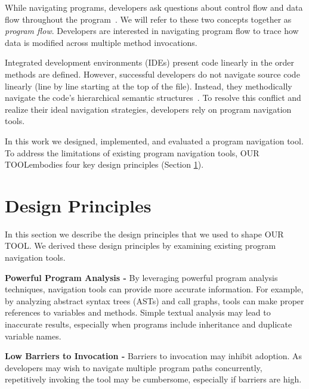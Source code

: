 \documentclass[conference]{IEEEtran}
\newcommand{\toolName}{OUR TOOL}
\begin{document}
While navigating programs, developers ask questions about control flow and data flow throughout the program~\cite{latoza2010hard, Smith2015}. We will refer to these two concepts together as \textit{program flow}. Developers are interested in navigating program flow to trace how data is modified across multiple method invocations.

Integrated development environments (IDEs) present code linearly in the order methods are defined. However, successful developers do not navigate source code linearly (line by line starting at the top of the file). Instead, they methodically navigate the code's hierarchical semantic structures~\cite{robillard2004investigate}. To resolve this conflict and realize their ideal navigation strategies, developers rely on program navigation tools. 


In this work we designed, implemented, and evaluated a program navigation tool.
To address the limitations of existing program navigation tools, \toolName embodies four key design principles (Section \ref{DesignPrinciples}).



\section{Design Principles}
\label{DesignPrinciples}
In this section we describe the design principles that we used to shape \toolName. We derived these design principles by examining existing program navigation tools.
 
\vspace{1em} 
\noindent\textbf{Powerful Program Analysis -}
By leveraging powerful program analysis techniques, navigation tools can provide more accurate information.
For example, by analyzing abstract syntax trees (ASTs) and call graphs, tools can make proper references to variables and methods. 
Simple textual analysis may lead to inaccurate results, especially when programs include inheritance and duplicate variable names.

\vspace{1em} 
\noindent\textbf{Low Barriers to Invocation -}
Barriers to invocation may inhibit adoption. 
As developers may wish to navigate multiple program paths concurrently, repetitively invoking the tool may be cumbersome, especially if barriers are high. 
\end{document}
